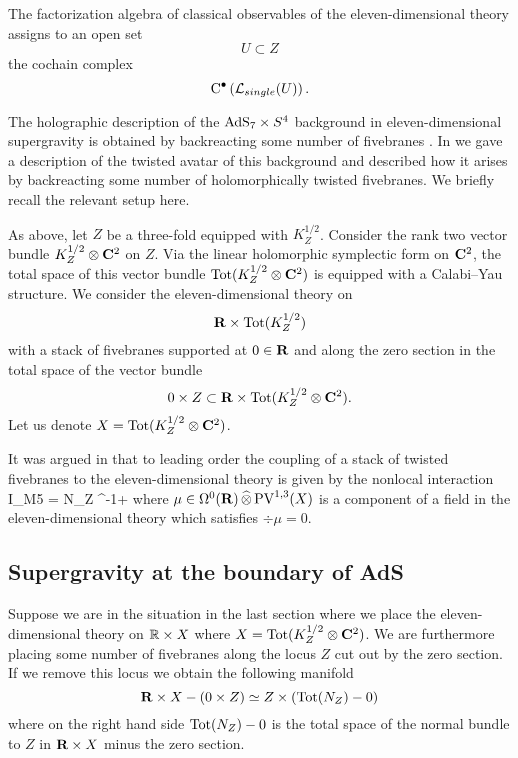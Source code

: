 \documentclass[11pt]{amsart}
\begin{document}
\parsec[s:singleobs]

The factorization algebra of classical observables of the eleven-dimensional theory assigns to an open set 
\[
U \subset Z
\]
the cochain complex
\[
{\rm C}^\bullet\left(\mathcal L_{single}(U)\right) .
\]

\parsec[s:coupling]

The holographic description of the ${\rm AdS}_7 \times S^4$ background in eleven-dimensional supergravity is obtained by backreacting some number of fivebranes . 
In \cite{RSW} we gave a description of the twisted avatar of this background and described how it arises by backreacting some number of holomorphically twisted fivebranes. 
We briefly recall the relevant setup here. 

As above, let $Z$ be a three-fold equipped with $K^{1/2}_Z$.
Consider the rank two vector bundle $K^{1/2}_Z \otimes \mathbf{C}^2$ on $Z$. 
Via the linear holomorphic symplectic form on $\mathbf{C}^2$, the total space of this vector bundle ${\rm Tot}(K^{1/2}_Z \otimes \mathbf{C}^2)$ is equipped with a Calabi--Yau structure. 
We consider the eleven-dimensional theory on 
\[
\mathbf{R} \times {\rm Tot}(K^{1/2}_Z) 
\]
with a stack of fivebranes supported at $0 \in \mathbf{R}$ and along the zero section in the total space of the vector bundle
\[
0 \times Z \subset \mathbf{R} \times {\rm Tot}(K^{1/2}_Z \otimes \mathbf{C}^2)  .
\]
Let us denote $X = {\rm Tot}(K^{1/2}_Z \otimes \mathbf{C}^2)$. 

It was argued in \cite{RSW} that to leading order the coupling of a stack of twisted fivebranes to the eleven-dimensional theory is given by the nonlocal interaction 
\beqn\label{eqn:br1}
I_{M5} = N\int_{Z} \div^{-1}\mu \vee \Omega +\cdots 
\eeqn
where $\mu \in \Omega^0 (\mathbf{R}) \, \widehat{\otimes} \, {\rm PV}^{1,3}(X)$ is a component of a field in the eleven-dimensional theory which satisfies $\div \mu = 0$. 

\subsection{Supergravity at the boundary of AdS}

Suppose we are in the situation in the last section where we place the eleven-dimensional theory on $\mathbb R \times X$ where $X = {\rm Tot}(K^{1/2}_Z \otimes \mathbf{C}^2)$. 
We are furthermore placing some number of fivebranes along the locus $Z$ cut out by the zero section. 
If we remove this locus we obtain the following manifold 
\[
\mathbf{R} \times X - \left(0 \times Z\right) \simeq Z \times \left({\rm Tot}(N_Z) - 0\right) 
\]
where on the right hand side ${\rm Tot}(N_Z) - 0$ is the total space of the normal bundle to $Z$ in $\mathbf{R} \times X$ minus the zero section.
\end{document}
